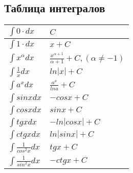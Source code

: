\documentclass[a4paper,12pt]{article} %
\begin{document}
\begin{center}
\section*{Таблица интегралов}
\begin{table}[h]
\begin{tabular}{|p{200pt}|p{200pt}|}
\hline
$\int{0 \cdot dx}$ & $C$ \\
\hline
$\int{1 \cdot dx}$ & $x+C$\\
\hline
$\int{x^{\alpha}dx}$ & $\frac{x^{\alpha+1}}{\alpha+1}+C , (\alpha\neq-1) $ \\
\hline
$\int{\frac{1}{x}dx}$ & $ln|x|+C$\\
\hline
$\int{a^x dx}$ & $\frac{a^x}{lna}+C$ \\
\hline
$\int{sinxdx}$ & $-cosx+C$\\
\hline
$\int{cosxdx}$ & $sinx+C$ \\
\hline
$\int{tgxdx}$ & $-ln|cosx|+C$ \\
\hline
$\int{ctgxdx}$ & $ln|sinx|+C$ \\
\hline
$\int{\frac{1}{cos^2x}dx}$ & $tgx+C$ \\
\hline
$\int{\frac{1}{sin^2x}dx}$ & $-ctgx+C$ \\
\hline
\end{tabular} 
\end{table}
\end{center}
\end{document}
